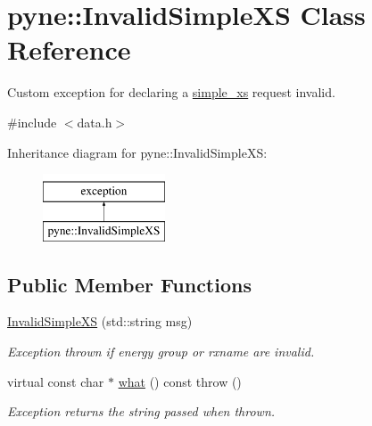 \hypertarget{classpyne_1_1_invalid_simple_x_s}{\section{pyne\+:\+:Invalid\+Simple\+X\+S Class Reference}
\label{classpyne_1_1_invalid_simple_x_s}
}


Custom exception for declaring a \hyperlink{structsimple__xs}{simple\+\_\+xs} request invalid.  




{\ttfamily \#include $<$data.\+h$>$}

Inheritance diagram for pyne\+:\+:Invalid\+Simple\+X\+S\+:\begin{figure}[H]
\begin{center}
\leavevmode
\includegraphics[height=2.000000cm]{classpyne_1_1_invalid_simple_x_s}
\end{center}
\end{figure}
\subsection*{Public Member Functions}
\begin{DoxyCompactItemize}
\item 
\hypertarget{classpyne_1_1_invalid_simple_x_s_ad3bac5f587ea476c11a622024914d074}{\hyperlink{classpyne_1_1_invalid_simple_x_s_ad3bac5f587ea476c11a622024914d074}{Invalid\+Simple\+X\+S} (std\+::string msg)}\label{classpyne_1_1_invalid_simple_x_s_ad3bac5f587ea476c11a622024914d074}

\begin{DoxyCompactList}\small\item\em Exception thrown if energy group or rxname are invalid. \end{DoxyCompactList}\item 
\hypertarget{classpyne_1_1_invalid_simple_x_s_aaafdfd9422833d680a00d7c00263b04a}{virtual const char $\ast$ \hyperlink{classpyne_1_1_invalid_simple_x_s_aaafdfd9422833d680a00d7c00263b04a}{what} () const   throw ()}\label{classpyne_1_1_invalid_simple_x_s_aaafdfd9422833d680a00d7c00263b04a}

\begin{DoxyCompactList}\small\item\em Exception returns the string passed when thrown. \end{DoxyCompactList}\end{DoxyCompactItemize}


